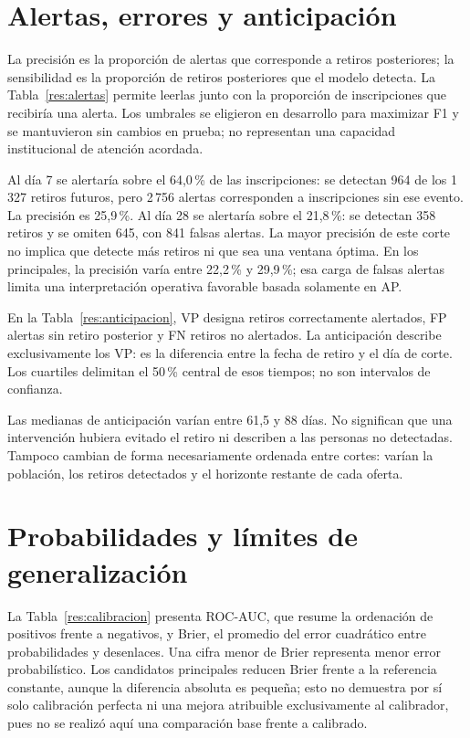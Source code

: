 \section{Alertas, errores y anticipación}
La precisión es la proporción de alertas que corresponde a retiros posteriores; la sensibilidad es la proporción de retiros posteriores que el modelo detecta. La Tabla~\ref{res:alertas} permite leerlas junto con la proporción de inscripciones que recibiría una alerta. Los umbrales se eligieron en desarrollo para maximizar F1 y se mantuvieron sin cambios en prueba; no representan una capacidad institucional de atención acordada.


Al día 7 se alertaría sobre el 64,0\,\% de las inscripciones: se detectan 964 de los 1\,327 retiros futuros, pero 2\,756 alertas corresponden a inscripciones sin ese evento. La precisión es 25,9\,\%. Al día 28 se alertaría sobre el 21,8\,\%: se detectan 358 retiros y se omiten 645, con 841 falsas alertas. La mayor precisión de este corte no implica que detecte más retiros ni que sea una ventana óptima. En los principales, la precisión varía entre 22,2\,\% y 29,9\,\%; esa carga de falsas alertas limita una interpretación operativa favorable basada solamente en AP.

En la Tabla~\ref{res:anticipacion}, VP designa retiros correctamente alertados, FP alertas sin retiro posterior y FN retiros no alertados. La anticipación describe exclusivamente los VP: es la diferencia entre la fecha de retiro y el día de corte. Los cuartiles delimitan el 50\,\% central de esos tiempos; no son intervalos de confianza.


Las medianas de anticipación varían entre 61,5 y 88 días. No significan que una intervención hubiera evitado el retiro ni describen a las personas no detectadas. Tampoco cambian de forma necesariamente ordenada entre cortes: varían la población, los retiros detectados y el horizonte restante de cada oferta.

\section{Probabilidades y límites de generalización}
La Tabla~\ref{res:calibracion} presenta ROC-AUC, que resume la ordenación de positivos frente a negativos, y Brier, el promedio del error cuadrático entre probabilidades y desenlaces. Una cifra menor de Brier representa menor error probabilístico. Los candidatos principales reducen Brier frente a la referencia constante, aunque la diferencia absoluta es pequeña; esto no demuestra por sí solo calibración perfecta ni una mejora atribuible exclusivamente al calibrador, pues no se realizó aquí una comparación base frente a calibrado.


